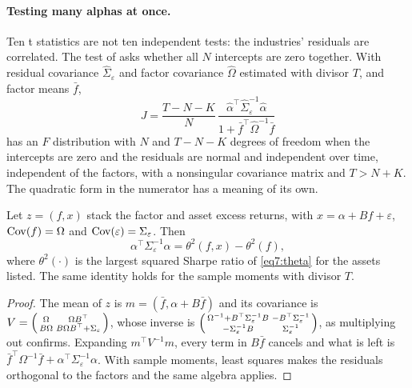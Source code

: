 \begin{chapterrefs}
\paragraph{Testing many alphas at once.}
Ten t statistics are not ten independent tests: the industries' residuals are correlated. The test of
\textcite{gibbons1989} asks whether all $N$ intercepts are zero together. With residual covariance
$\hat\Sigma_\varepsilon$ and factor covariance $\hat\Omega$ estimated with divisor $T$, and factor means $\bar f$,
\begin{equation}\label{eq7:grs}
  J=\frac{T-N-K}{N}\,\frac{\hat\alpha^\top\hat\Sigma_\varepsilon^{-1}\hat\alpha}{1+\bar f^\top\hat\Omega^{-1}\bar f}
\end{equation}
has an $F$ distribution with $N$ and $T-N-K$ degrees of freedom when the intercepts are zero and the
residuals are normal and independent over time, independent of the factors, with a nonsingular
covariance matrix and $T>N+K$. The quadratic form in the numerator has a meaning of
its own.

\begin{proposition}\label{prop7:grs}
Let $z=(f,x)$ stack the factor and asset excess returns, with $x=\alpha+Bf+\varepsilon$, $\operatorname{Cov}(f)=\Omega$
and $\operatorname{Cov}(\varepsilon)=\Sigma_\varepsilon$. Then
\begin{equation}\label{eq7:grsid}
  \alpha^\top\Sigma_\varepsilon^{-1}\alpha=\theta^2(f,x)-\theta^2(f),
\end{equation}
where $\theta^2(\cdot)$ is the largest squared Sharpe ratio of \cref{eq7:theta} for the assets listed.
The same identity holds for the sample moments with divisor $T$.
\end{proposition}

\begin{proof}
The mean of $z$ is $m=(\bar f,\alpha+B\bar f)$ and its covariance is $V=\begin{psmallmatrix}\Omega&\Omega B^\top\\ B\Omega&B\Omega B^\top+\Sigma_\varepsilon\end{psmallmatrix}$,
whose inverse is $\begin{psmallmatrix}\Omega^{-1}+B^\top\Sigma_\varepsilon^{-1}B&-B^\top\Sigma_\varepsilon^{-1}\\-\Sigma_\varepsilon^{-1}B&\Sigma_\varepsilon^{-1}\end{psmallmatrix}$,
as multiplying out confirms. Expanding $m^\top V^{-1}m$, every term in $B\bar f$ cancels and what is
left is $\bar f^\top\Omega^{-1}\bar f+\alpha^\top\Sigma_\varepsilon^{-1}\alpha$. With sample moments, least squares
makes the residuals orthogonal to the factors and the same algebra applies.
\end{proof}


\end{chapterrefs}
